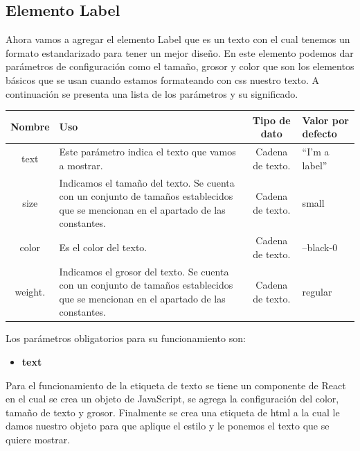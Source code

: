 \subsection{Elemento Label}
Ahora vamos a agregar el elemento Label que es un texto con el cual tenemos un formato estandarizado para tener un mejor diseño. En este elemento podemos dar parámetros de configuración como el tamaño, grosor y color que son los elementos básicos que se usan cuando estamos formateando con css nuestro texto. 
A continuación se presenta una lista de los parámetros y  su significado.
\newline
\begin{center}
 \begin{tabular}{ | c |  p{5cm}  | c | p{3cm} |} 
 \hline
 \textbf{Nombre} &  \textbf{Uso} &  \textbf{ Tipo de dato} &  \textbf{Valor por defecto}\\ [0.5ex] 
 \hline\hline
text 		& Este parámetro  indica el texto que vamos a mostrar.  &  Cadena de texto. 	& “I’m a label” \\  [2.5ex] 
 \hline
size 	        & Indicamos el tamaño del texto. Se cuenta con un conjunto de tamaños establecidos que se mencionan en el apartado de las constantes.       & Cadena de texto.  	& small \\[2.5ex] 
 \hline
color        & Es el color del texto.						    & Cadena de texto. 	& --black-0 \\[3.5ex] 
 \hline
 weight.   & Indicamos el grosor del texto. Se cuenta con un conjunto de tamaños establecidos que se mencionan en el apartado de las constantes.&  Cadena de texto. 	& regular \\[2.5ex] 
 \hline
\end{tabular}
\end{center}
\newline
\newline
Los parámetros obligatorios para su funcionamiento son:
\begin{itemize}
\item \textbf{text} 
\end{itemize}
\newline
\newline
Para el funcionamiento de la etiqueta de texto se tiene un componente de React en el cual se crea un objeto de JavaScript, se agrega la configuración del color, tamaño de texto y grosor. Finalmente se crea una etiqueta de html a la cual le damos nuestro objeto para que aplique el estilo y le ponemos el texto que se quiere mostrar.
\newline
